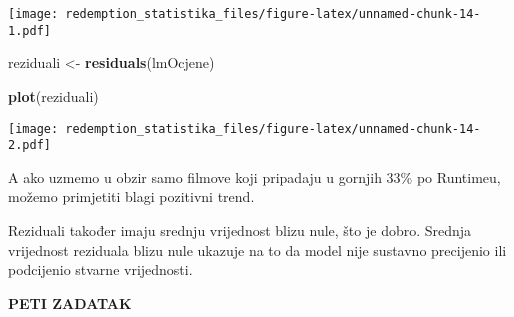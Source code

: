 \documentclass[
]{article}
\newenvironment{Shaded}{\begin{snugshade}}{\end{snugshade}}
\newcommand{\FunctionTok}[1]{\textcolor[rgb]{0.13,0.29,0.53}{\textbf{#1}}}
\newcommand{\NormalTok}[1]{#1}
\newcommand{\OtherTok}[1]{\textcolor[rgb]{0.56,0.35,0.01}{#1}}
\begin{document}
\texttt{[image: redemption\_statistika\_files/figure-latex/unnamed-chunk-14-1.pdf]}

\begin{Shaded}
\begin{Highlighting}[]
\NormalTok{reziduali }\OtherTok{\textless{}{-}} \FunctionTok{residuals}\NormalTok{(lmOcjene)}


\FunctionTok{plot}\NormalTok{(reziduali)}
\end{Highlighting}
\end{Shaded}

\texttt{[image: redemption\_statistika\_files/figure-latex/unnamed-chunk-14-2.pdf]}

A ako uzmemo u obzir samo filmove koji pripadaju u gornjih 33\% po
Runtimeu, možemo primjetiti blagi pozitivni trend.

Reziduali također imaju srednju vrijednost blizu nule, što je dobro.
Srednja vrijednost reziduala blizu nule ukazuje na to da model nije
sustavno precijenio ili podcijenio stvarne vrijednosti.

\textbf{PETI ZADATAK}
\end{document}
